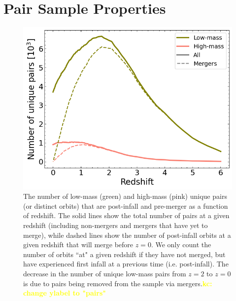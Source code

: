 \documentclass[twocolumn,linenumbers]{aastex631}
\newcommand{\kc}[1]{\textcolor{yellow}{\textbf{kc: #1}} }
\begin{document}
\section{Pair Sample Properties}
\begin{figure}[htb]
    \begin{center}
    \includegraphics[width=\columnwidth]{plots/bet-on-it/6_paircount.png}
    \caption{The number of low-mass (green) and high-mass (pink) unique pairs (or distinct orbits) that are post-infall and pre-merger as a function of redshift. 
    The solid lines show the total number of pairs at a given redshift (including non-mergers and mergers that have yet to merge), while dashed lines show the number of post-infall orbits at a given redshift that will merge before $z=0$.
    We only count the number of orbits ``at" a given redshift if they have not merged, but have experienced first infall at a previous time (i.e. post-infall). 
    The decrease in the number of unique low-mass pairs from $z=2$ to $z=0$ is due to pairs being removed from the sample via mergers.\kc{change ylabel to "pairs"}
    }
    \label{fig:numorbits}
    \end{center}
\end{figure}
\end{document}
